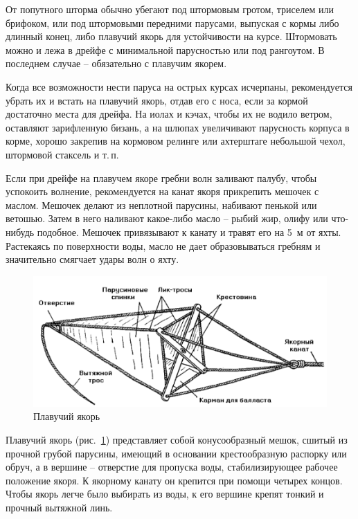 \documentclass[a4paper, 12pt, twoside, final]{scrbook}
\begin{document}
От попутного шторма обычно убегают под штормовым гротом, триселем или брифоком, или под штормовыми передними парусами, выпуская с кормы либо длинный конец, либо плавучий якорь для устойчивости на курсе. Штормовать можно и лежа в дрейфе с минимальной парусностью или под рангоутом. В последнем случае \--- обязательно с плавучим якорем.

Когда все возможности нести паруса на острых курсах исчерпаны, рекомендуется убрать их и встать на плавучий якорь, отдав его с носа, если за кормой достаточно места для дрейфа. На иолах и кэчах, чтобы их не водило ветром, оставляют зарифленную бизань, а на шлюпах увеличивают парусность корпуса в корме, хорошо закрепив на кормовом релинге или ахтерштаге небольшой чехол, штормовой стаксель и т.\,п.

Если при дрейфе на плавучем якоре гребни волн заливают палубу, чтобы успокоить волнение, рекомендуется на канат якоря прикрепить мешочек с маслом. Мешочек делают из неплотной парусины, набивают пенькой или ветошью. Затем в него наливают какое-либо масло \--- рыбий жир, олифу или что-нибудь подобное. Мешочек привязывают к канату и травят его на 5~м от яхты. Растекаясь по поверхности воды, масло не дает образовываться гребням и значительно смягчает удары волн о яхту.

\begin{figure}[htbp]
   \centering
   \includegraphics{117_Plav_yakor} %
   \caption{Плавучий якорь}
   \label{fig:117}
\end{figure}

Плавучий якорь (рис.~\ref{fig:117}) представляет собой конусообразный мешок, сшитый из прочной грубой парусины, имеющий в основании крестообразную распорку или обруч, а в вершине \--- отверстие для пропуска воды, стабилизирующее рабочее положение якоря. К якорному канату он крепится при помощи четырех концов. Чтобы якорь легче было выбирать из воды, к его вершине крепят тонкий и прочный вытяжной линь. 
\end{document}
